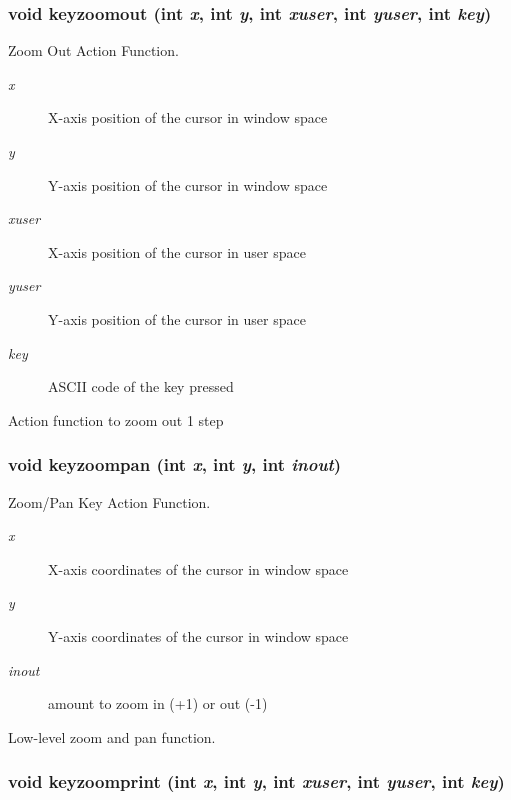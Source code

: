 \subsubsection{\setlength{\rightskip}{0pt plus 5cm}void keyzoomout (int {\em x}, int {\em y}, int {\em xuser}, int {\em yuser}, int {\em key})}\label{xtv_8h_a104}


Zoom Out Action Function. 

\begin{Desc}
\item[Parameters:]
\begin{description}
\item[{\em x}]X-axis position of the cursor in window space \item[{\em y}]Y-axis position of the cursor in window space \item[{\em xuser}]X-axis position of the cursor in user space \item[{\em yuser}]Y-axis position of the cursor in user space \item[{\em key}]ASCII code of the key pressed\end{description}
\end{Desc}
Action function to zoom out 1 step 
\subsubsection{\setlength{\rightskip}{0pt plus 5cm}void keyzoompan (int {\em x}, int {\em y}, int {\em inout})}\label{xtv_8h_a102}


Zoom/Pan Key Action Function. 

\begin{Desc}
\item[Parameters:]
\begin{description}
\item[{\em x}]X-axis coordinates of the cursor in window space \item[{\em y}]Y-axis coordinates of the cursor in window space \item[{\em inout}]amount to zoom in (+1) or out (-1)\end{description}
\end{Desc}
Low-level zoom and pan function. 
\subsubsection{\setlength{\rightskip}{0pt plus 5cm}void keyzoomprint (int {\em x}, int {\em y}, int {\em xuser}, int {\em yuser}, int {\em key})}\label{xtv_8h_a107}


